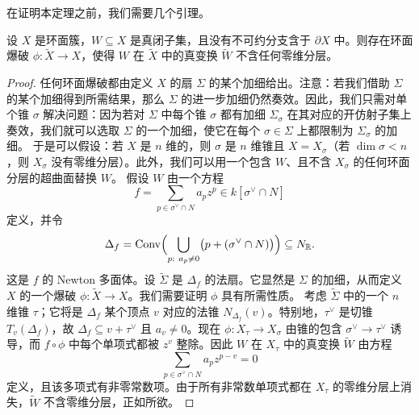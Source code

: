 
在证明本定理之前，我们需要几个引理。

\begin{lemma}
设 $X$ 是环面簇，$W\subseteq X$ 是真闭子集，且没有不可约分支含于 $\partial X$ 中。则存在环面爆破 $\phi:\widetilde X\to X$，使得 $W$ 在 $\widetilde X$ 中的真变换 $\widetilde W$ 不含任何零维分层。
\end{lemma}

\begin{proof}
任何环面爆破都由定义 $X$ 的扇 $\Sigma$ 的某个加细给出。注意：若我们借助 $\Sigma$ 的某个加细得到所需结果，那么 $\Sigma$ 的进一步加细仍然奏效。因此，我们只需对单个锥 $\sigma$ 解决问题：因为若对 $\Sigma$ 中每个锥 $\sigma$ 都有加细 $\Sigma_\sigma$ 在其对应的开仿射子集上奏效，我们就可以选取 $\Sigma$ 的一个加细，使它在每个 $\sigma\in\Sigma$ 上都限制为 $\Sigma_\sigma$ 的加细。
于是可以假设：若 $X$ 是 $n$ 维的，则 $\sigma$ 是 $n$ 维锥且 $X=X_\sigma$（若 $\dim\sigma<n$，则 $X_\sigma$ 没有零维分层）。此外，我们可以用一个包含 $W$、且不含 $X_\sigma$ 的任何环面分层的超曲面替换 $W$。
假设 $W$ 由一个方程
\[
f=\sum_{p\in\sigma^\vee\cap N}a_pz^p\in k[\sigma^\vee\cap N]
\]
定义，并令
\[
\Delta_f=\operatorname{Conv}\Bigl(\bigcup_{p:\ a_p\neq0}\bigl(p+(\sigma^\vee\cap N)\bigr)\Bigr)\subseteq N_\R .
\]
这是 $f$ 的 Newton 多面体。设 $\widetilde\Sigma$ 是 $\Delta_f$ 的法扇。它显然是 $\Sigma$ 的加细，从而定义 $X$ 的一个爆破 $\phi:\widetilde X\to X$。我们需要证明 $\phi$ 具有所需性质。
考虑 $\widetilde\Sigma$ 中的一个 $n$ 维锥 $\tau$；它将是 $\Delta_f$ 某个顶点 $v$ 对应的法锥 $N_{\Delta_f}(v)$。特别地，$\tau^\vee$ 是切锥 $T_v(\Delta_f)$，故 $\Delta_f\subseteq v+\tau^\vee$ 且 $a_v\neq0$。现在 $\phi:X_\tau\to X_\sigma$ 由锥的包含 $\sigma^\vee\to\tau^\vee$ 诱导，而 $f\circ\phi$ 中每个单项式都被 $z^v$ 整除。因此 $W$ 在 $X_\tau$ 中的真变换 $\widetilde W$ 由方程
\[
\sum_{p\in\sigma^\vee\cap N}a_pz^{p-v}=0
\]
定义，且该多项式有非零常数项。由于所有非常数单项式都在 $X_\tau$ 的零维分层上消失，$\widetilde W$ 不含零维分层，正如所欲。
\end{proof}


